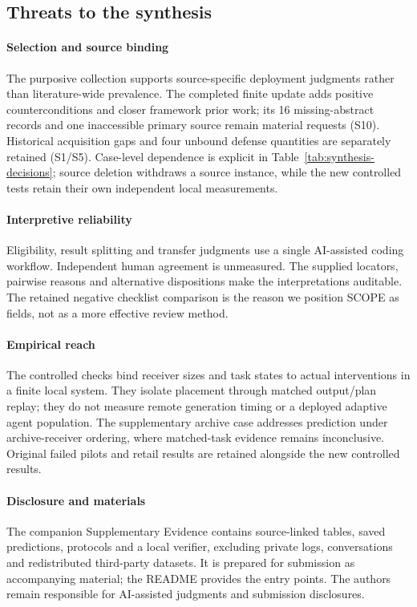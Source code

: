 \subsection{Threats to the synthesis}
\paragraph{Selection and source binding}
The purposive collection supports source-specific deployment judgments rather than literature-wide prevalence. The completed finite update adds positive counterconditions and closer framework prior work; its 16 missing-abstract records and one inaccessible primary source remain material requests (S10). Historical acquisition gaps and four unbound defense quantities are separately retained (S1/S5). Case-level dependence is explicit in Table~\ref{tab:synthesis-decisions}; source deletion withdraws a source instance, while the new controlled tests retain their own independent local measurements.

\paragraph{Interpretive reliability}
Eligibility, result splitting and transfer judgments use a single AI-assisted coding workflow. Independent human agreement is unmeasured. The supplied locators, pairwise reasons and alternative dispositions make the interpretations auditable. The retained negative checklist comparison is the reason we position SCOPE as fields, not as a more effective review method.

\paragraph{Empirical reach}
The controlled checks bind receiver sizes and task states to actual interventions in a finite local system. They isolate placement through matched output/plan replay; they do not measure remote generation timing or a deployed adaptive agent population. The supplementary archive case addresses prediction under archive-receiver ordering, where matched-task evidence remains inconclusive. Original failed pilots and retail results are retained alongside the new controlled results.

\paragraph{Disclosure and materials}
The companion Supplementary Evidence contains source-linked tables, saved predictions, protocols and a local verifier, excluding private logs, conversations and redistributed third-party datasets. It is prepared for submission as accompanying material; the README provides the entry points. The authors remain responsible for AI-assisted judgments and submission disclosures.
